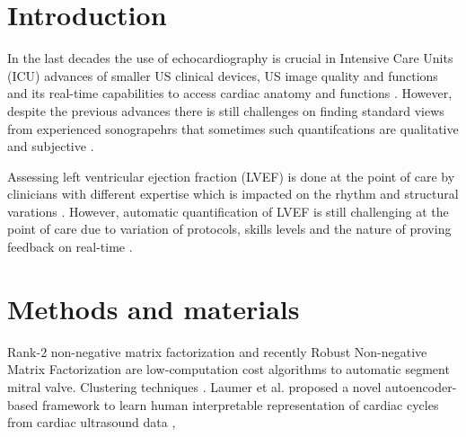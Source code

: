 \section{Introduction}
\label{sec:intro}
In the last decades the use of echocardiography is crucial in Intensive Care Units (ICU) advances of smaller US clinical devices, US image quality and functions and its real-time capabilities to access cardiac anatomy and functions \cite{Feigenbaum1996, Vieillard-Baron2008, singh2007, cambell2018}.
However, despite the previous advances there is still challenges on finding standard views from experienced sonograpehrs that sometimes  such quantifcations are qualitative and subjective \cite{Feigenbaum1996}.

Assessing left ventricular ejection fraction (LVEF) is done at the point of care by clinicians with different expertise which is impacted on the rhythm and structural varations \cite{liu2021}.
However, automatic quantification of LVEF is still challenging at the point of care due to variation of protocols, skills levels \cite{field2011} and the nature of proving feedback on real-time \cite{liu2021}.

\section{Methods and materials}
Rank-2 non-negative matrix factorization \cite{yuan2017} and recently Robust Non-negative Matrix Factorization
\cite{dukler2018} are low-computation cost algorithms to automatic segment mitral valve.
Clustering techniques \cite{zhang2018} \cite{kusunose2021}.
Laumer et al. proposed a novel autoencoder-based framework to learn human interpretable representation of cardiac cycles from cardiac ultrasound data \cite{laumer2020},
